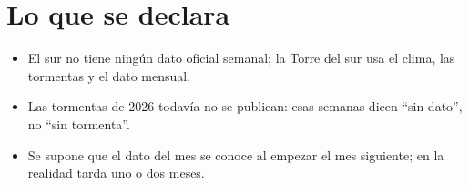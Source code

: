 \section{Lo que se declara}
\begin{itemize}
\item El sur no tiene ningún dato oficial semanal; la Torre del sur usa el clima, las tormentas y el dato mensual.
\item Las tormentas de 2026 todavía no se publican: esas semanas dicen ``sin dato'', no ``sin tormenta''.
\item Se supone que el dato del mes se conoce al empezar el mes siguiente; en la realidad tarda uno o dos meses.
\end{itemize}
